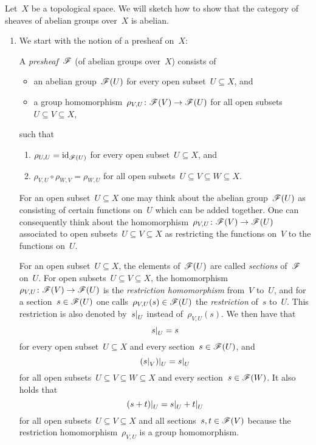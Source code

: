 


\begin{example}
  Let~$X$ be a topological space.
  We will sketch how to show that the category of sheaves of abelian groups over~$X$ is abelian.
  \begin{enumerate}
    \item
      We start with the notion of a presheaf on~$X$:
      
      \begin{definitionnonum}
        A \emph{presheaf}~$\mathscr{F}$ (of abelian groups over~$X$) consists of
        \begin{itemize}
          \item
            an abelian group~$\mathscr{F}(U)$ for every open subset~$U \subseteq X$, and
          \item
            a group homomorphism~$\rho_{V,U} \colon \mathscr{F}(V) \to \mathscr{F}(U)$ for all open subsets~$U \subseteq V \subseteq X$,
        \end{itemize}
        such that
        \begin{enumerate}[label=(P\arabic*)]
          \item
            $\rho_{U,U} = \operatorname{id}_{\mathscr{F}(U)}$ for every open subset~$U \subseteq X$, and
          \item
            $\rho_{V,U} \circ \rho_{W,V} = \rho_{W,U}$ for all open subsets~$U \subseteq V \subseteq W \subseteq X$.
        \end{enumerate}
      \end{definitionnonum}
      
      For an open subset~$U \subseteq X$ one may think about the abelian group~$\mathscr{F}(U)$ as consisting of certain functions on~$U$ which can be added together.
      One can consequently think about the homomorphism~$\rho_{V,U} \colon \mathscr{F}(V) \to \mathscr{F}(U)$ associated to open subsets~$U \subseteq V \subseteq X$ as restricting the functions on~$V$ to the functions on~$U$.
      
      For an open subset~$U \subseteq X$, the elements of~$\mathscr{F}(U)$ are called \emph{sections} of~$\mathscr{F}$ on~$U$.
      For open subsets~$U \subseteq V \subseteq X$, the homomorphism~$\rho_{V,U} \colon \mathscr{F}(V) \to \mathscr{F}(U)$ is the \emph{restriction homomorphism} from~$V$ to~$U$, and for a section~$s \in \mathscr{F}(U)$ one calls~$\rho_{V,U}(s) \in \mathscr{F}(U)$ the \emph{restriction} of~$s$ to~$U$.
      This restriction is also denoted by~$\restrict{s}{U}$ instead of~$\rho_{V,U}(s)$.
      We then have that
      \[
        \restrict{s}{U} = s
      \]
      for every open subset~$U \subseteq X$ and every section~$s \in \mathscr{F}(U)$, and
      \[
        \restrict{ (\restrict{s}{V}) }{U} = \restrict{s}{U}
      \]
      for all open subsets~$U \subseteq V \subseteq W \subseteq X$ and every section~$s \in \mathscr{F}(W)$.
      It also holds that
      \[
          \restrict{(s+t)}{U}
        = \restrict{s}{U} + \restrict{t}{U}
      \]
      for all open subsets~$U \subseteq V \subseteq X$ and all sections~$s, t \in \mathscr{F}(V)$  because the restriction homomorphism~$\rho_{V,U}$ is a group homomorphism.
      

\end{enumerate}
\end{example}
